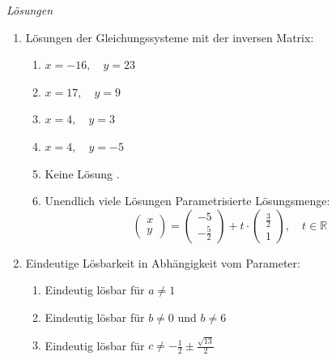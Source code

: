 \begin{ueb}
\end{ueb}
\clearpage
\emph{Lösungen}

\begin{enumerate}
    \item Lösungen der Gleichungssysteme mit der inversen Matrix:
    \begin{enumerate}
      \item \( x = -16, \quad y = 23 \)
      \item \( x = 17, \quad y = 9 \)
      \item \( x = 4, \quad y = 3 \)
      \item \( x = 4, \quad y = -5 \)
      \item Keine Lösung .
      \item Unendlich viele Lösungen  
      Parametrisierte Lösungsmenge:
      \[
      \begin{pmatrix}
      x \\
      y
      \end{pmatrix}
      =
      \begin{pmatrix}
      -5 \\
      -\frac{5}{2}
      \end{pmatrix}
      +
      t \cdot
      \begin{pmatrix}
      \frac{3}{2} \\
      1
      \end{pmatrix},
      \quad t \in \mathbb{R}
      \]
    \end{enumerate}
    
  \item Eindeutige Lösbarkeit in Abhängigkeit vom Parameter:
  \begin{enumerate}
    \item Eindeutig lösbar für \( a \neq 1 \)
    \item Eindeutig lösbar für \( b \neq 0 \) und $b\neq 6$
    \item Eindeutig lösbar für \( c \neq -\frac{1}{2} \pm \frac{\sqrt{13}}{2} \)
  \end{enumerate}
  \end{enumerate}